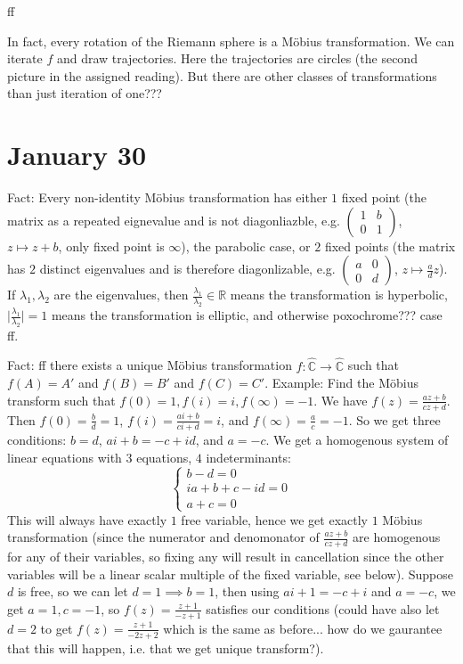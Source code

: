 \documentclass{article}
\theoremstyle{plain}
\theoremstyle{remark}
\newcommand{\R}{{\mathbb R}}
\newcommand{\C}{{\mathbb C}}
\begin{document}
ff

In fact, every rotation of the Riemann sphere is a M\"{o}bius transformation.
We can iterate $f$ and draw trajectories.
Here the trajectories are circles (the second picture in the assigned reading).
But there are other classes of transformations than just iteration of one???


\section{January 30}
Fact: Every non-identity M\"{o}bius transformation has either 
$1$ fixed point (the matrix as a repeated eignevalue and is not diagonliazble,
e.g. $\begin{pmatrix} 1 & b \\ 0 & 1 \end{pmatrix}$, $z \mapsto z + b$,
only fixed point is $\infty$), the parabolic case,
or $2$ fixed points (the matrix has $2$ distinct eigenvalues
and is therefore diagonlizable,
e.g. $\begin{pmatrix} a & 0 \\ 0 & d \end{pmatrix}$, $z \mapsto \frac{a}{d}z$).
If $\lambda_1,\lambda_2$ are the eigenvalues, then $\frac{\lambda_1}{\lambda_2}\in\R$
means the transformation is hyperbolic,
$\lvert \frac{\lambda_1}{\lambda_2}\rvert = 1$ means the transformation is elliptic,
and otherwise poxochrome??? case ff.

Fact: ff there exists a unique M\"{o}bius transformation
$f \colon \hat{\C} \to \hat{\C}$ such that $f(A) = A'$
and $f(B) = B'$ and $f(C) = C'$.
Example: Find the M\"{o}bius transform such that
$f(0) = 1, f(i) = i, f(\infty) = -1$.
We have $f(z) = \frac{az+b}{cz+d}$.
Then $f(0) = \frac{b}{d} = 1$,
$f(i) = \frac{ai + b}{ci + d} = i$, and $f(\infty) = \frac{a}{c} = -1$.
So we get three conditions: $b = d$, $ai + b = -c + id$, and $a = -c$.
We get a homogenous system of linear equations with $3$ equations, $4$ indeterminants:
\[
	\begin{cases}
		b - d = 0\\
		ia + b + c -id = 0\\
		a + c = 0
	\end{cases}
\]
This will always have exactly $1$ free variable,
hence we get exactly $1$ M\"{o}bius transformation
(since the numerator and denomonator of $\frac{az+b}{cz+d}$ are
homogenous for any of their variables,
so fixing any will result in cancellation since the other variables
will be a linear scalar multiple of the fixed variable, see below).
Suppose $d$ is free, so we can let $d = 1 \implies b = 1$,
then using $ai + 1 = -c + i$ and $a = -c$, we get $a = 1, c = -1$,
so $f(z) = \frac{z+1}{-z+1}$ satisfies our conditions
(could have also let $d = 2$ to get $f(z) = \frac{z+1}{-2z+2}$ which is the same as before...
how do we gaurantee that this will happen, i.e. that we get unique transform?).
\end{document}
